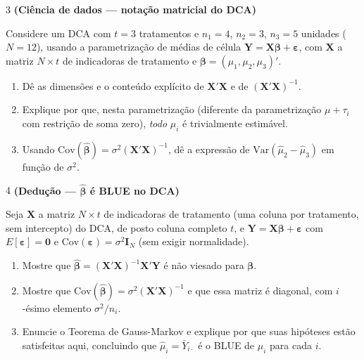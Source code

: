 \documentclass[11pt]{article}
\begin{document}
\begin{questao}{3} \textbf{(Ciência de dados --- notação matricial do DCA)}

Considere um DCA com $t = 3$ tratamentos e $n_1 = 4$, $n_2 = 3$, $n_3 = 5$ unidades ($N=12$),
usando a parametrização de médias de célula $\mathbf{Y} = \mathbf{X}\boldsymbol\beta +
\boldsymbol\varepsilon$, com $\mathbf{X}$ a matriz $N\times t$ de indicadoras de tratamento e
$\boldsymbol\beta = (\mu_1,\mu_2,\mu_3)'$.

\begin{enumerate}[label=(\alph*)]
  \item Dê as dimensões e o conteúdo explícito de $\mathbf{X}'\mathbf{X}$ e de
    $(\mathbf{X}'\mathbf{X})^{-1}$.
  \item Explique por que, nesta parametrização (diferente da parametrização $\mu + \tau_i$ com
    restrição de soma zero), \emph{todo} $\mu_i$ é trivialmente estimável.
  \item Usando $\mathrm{Cov}(\hat{\boldsymbol\beta}) = \sigma^2(\mathbf{X}'\mathbf{X})^{-1}$, dê a
    expressão de $\mathrm{Var}(\hat\mu_2 - \hat\mu_3)$ em função de $\sigma^2$.
\end{enumerate}
\end{questao}

\begin{questao}{4} \textbf{(Dedução --- $\hat{\boldsymbol\beta}$ é BLUE no DCA)}

Seja $\mathbf{X}$ a matriz $N\times t$ de indicadoras de tratamento (uma coluna por tratamento,
sem intercepto) do DCA, de posto coluna completo $t$, e $\mathbf{Y} = \mathbf{X}\boldsymbol\beta +
\boldsymbol\varepsilon$ com $E[\boldsymbol\varepsilon] = \mathbf{0}$ e
$\mathrm{Cov}(\boldsymbol\varepsilon) = \sigma^2\mathbf{I}_N$ (sem exigir normalidade).

\begin{enumerate}[label=(\alph*)]
  \item Mostre que $\hat{\boldsymbol\beta} = (\mathbf{X}'\mathbf{X})^{-1}\mathbf{X}'\mathbf{Y}$ é
    não viesado para $\boldsymbol\beta$.
  \item Mostre que $\mathrm{Cov}(\hat{\boldsymbol\beta}) = \sigma^2(\mathbf{X}'\mathbf{X})^{-1}$ e
    que essa matriz é diagonal, com $i$-ésimo elemento $\sigma^2/n_i$.
  \item Enuncie o Teorema de Gauss-Markov e explique por que suas hipóteses estão satisfeitas
    aqui, concluindo que $\hat\mu_i = \bar Y_{i\cdot}$ é o BLUE de $\mu_i$ para cada $i$.
\end{enumerate}
\end{questao}
\end{document}
